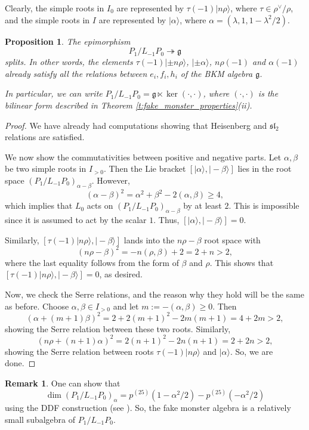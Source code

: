 \documentclass[11pt]{amsart}
\newcommand{\ket}[1]{|#1\rangle}
\renewcommand{\ge}{\geqslant}
\newcommand{\g}{\mathfrak{g}}
\renewcommand{\sl}{\mathfrak{sl}}
\numberwithin{equation}{section}
\theoremstyle{plain}
\newtheorem{proposition}[theorem]{Proposition}
\theoremstyle{definition}
\newtheorem{remark}[theorem]{Remark}
\begin{document}
Clearly, the simple roots in $I_0$ are represented by $\tau(-1)\ket{n\rho}$, where $\tau\in \rho^\vee/\rho$, and the simple roots in $I$ are represented by $\ket\alpha$, where $\alpha=(\lambda,1,1-\lambda^2/2)$.
\begin{proposition}
    The epimorphism
    $$
    P_1/L_{-1}P_0\twoheadrightarrow\g
    $$
    splits. In other words, the elements $\tau(-1)\ket{\pm n\rho}$, $\ket{\pm\alpha}$, $n\rho(-1)$ and $\alpha(-1)$ already satisfy all the relations between $e_i,f_i,h_i$ of the BKM algebra $\g$.

    In particular, we can write $P_1/L_{-1}P_0=\g\ltimes \ker(\cdot,\cdot)$, where $(\cdot,\cdot)$ is the bilinear form described in Theorem \ref{t:fake_monster_properties}(ii).
\end{proposition}
\begin{proof}
    We have already had computations showing that Heisenberg and $\sl_2$ relations are satisfied.

    We now show the commutativities between positive and negative parts. Let $\alpha,\beta$ be two simple roots in $I_{>0}$. Then the Lie bracket $[\ket\alpha,\ket{-\beta}]$ lies in the root space $(P_1/L_{-1}P_0)_{\alpha-\beta}$. However,
    $$
    (\alpha-\beta)^2=\alpha^2+\beta^2-2(\alpha,\beta)\ge 4,
    $$
    which implies that $L_0$ acts on $(P_1/L_{-1}P_0)_{\alpha-\beta}$ by at least $2$. This is impossible since it is assumed to act by the scalar $1$. Thus, $[\ket\alpha,\ket{-\beta}]=0$.

    Similarly, $[\tau(-1)\ket{n\rho},\ket{-\beta}]$ lands into the $n\rho-\beta$ root space with
    $$
    (n\rho-\beta)^2=-n(\rho,\beta)+2=2+n>2,
    $$
    where the last equality follows from the form of $\beta$ and $\rho$. This shows that $[\tau(-1)\ket{n\rho},\ket{-\beta}]=0$, as desired.

    Now, we check the Serre relations, and the reason why they hold will be the same as before. Choose $\alpha,\beta\in I_{>0}$ and let $m:=-(\alpha,\beta)\ge 0$. Then
    $$
    (\alpha+(m+1)\beta)^2=2+2(m+1)^2-2m(m+1)=4+2m>2,
    $$
    showing the Serre relation between these two roots. Similarly,
    $$
    (n\rho+(n+1)\alpha)^2=2(n+1)^2-2n(n+1)=2+2n>2,
    $$
    showing the Serre relation between roots $\tau(-1)\ket{n\rho}$ and $\ket\alpha$. So, we are done.
\end{proof}
\begin{remark}
    One can show that 
    $$
    \dim (P_1/L_{-1}P_0)_\alpha=p^{(25)}(1-\alpha^2/2)-p^{(25)}(-\alpha^2/2)
    $$
    using the DDF construction (see \cite[Formula 3.50]{GN94}). So, the fake monster algebra is a relatively small subalgebra of $P_1/L_{-1}P_0$. 
\end{remark}
\end{document}

